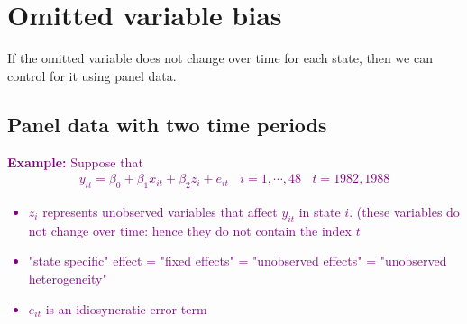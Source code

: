 \documentclass[a4paper,twoside,11pt]{article}
\begin{document}
\section{Omitted variable bias}
If the omitted variable does not change over time for each state, then we can control for it using panel data.

\subsection{Panel data with two time periods}
\textcolor{Purple}{\textbf{Example:}
\newline
Suppose that
\begin{equation*}
\begin{aligned}
y_{it} = \beta_0 + \beta_1 x_{it} + \beta_2 z_i + e_{it} \ \ \ \ i = 1,\cdots , 48 \ \ \ \ t = 1982,1988
\end{aligned}
\end{equation*}
\begin{itemize}
    \item $z_i$ represents unobserved variables that affect $y_{it}$ in state $i$. (these variables do not change over time: hence they do not contain the index $t$
    \item "state specific" effect = "fixed effects" = "unobserved effects" = "unobserved heterogeneity"
    \item $e_{it}$ is an idiosyncratic error term
\end{itemize}}
\end{document}
